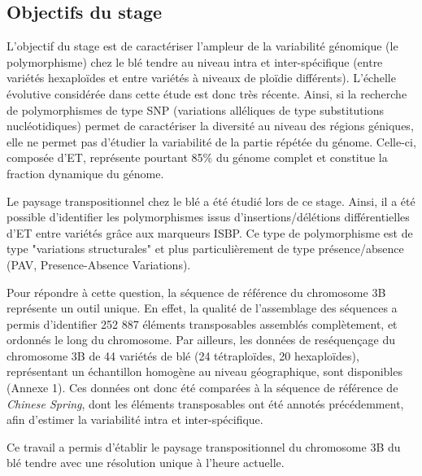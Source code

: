 \documentclass[a4paper, 12pt]{article}
\begin{document}
\begin{onehalfspace}
\section{Objectifs du stage}
L'objectif du stage est de caractériser l'ampleur de la variabilité génomique (le polymorphisme) chez le blé tendre au niveau intra et inter-spécifique (entre variétés hexaploïdes et entre variétés à niveaux de ploïdie différents). L'échelle évolutive considérée dans cette étude est donc très récente. Ainsi, si la recherche de polymorphismes de type SNP (variations alléliques de type substitutions nucléotidiques) permet de caractériser la diversité au niveau des régions géniques, elle ne permet pas d'étudier la variabilité de la partie répétée du génome. Celle-ci, composée d'ET, représente pourtant 85\% du génome complet et constitue la fraction dynamique du génome.

Le paysage transpositionnel chez le blé a été étudié lors de ce stage. Ainsi, il a été possible d'identifier les polymorphismes issus d'insertions/délétions différentielles d'ET entre variétés grâce aux marqueurs ISBP. Ce type de polymorphisme est de type "variations structurales" et plus particulièrement de type présence/absence (PAV, Presence-Absence Variations).

Pour répondre à cette question, la séquence de référence du chromosome 3B représente un outil unique. En effet, la qualité de l'assemblage des séquences a permis d'identifier 252 887 éléments transposables assemblés complètement, et ordonnés le long du chromosome. Par ailleurs, les données de reséquençage du chromosome 3B de 44 variétés de blé (24 tétraploïdes, 20 hexaploïdes), représentant un échantillon homogène au niveau géographique, sont disponibles (Annexe 1). Ces données ont donc été comparées à la séquence de référence de \textit{Chinese Spring}, dont les éléments transposables ont été annotés précédemment, afin d'estimer la variabilité intra et inter-spécifique. 

Ce travail a permis d'établir le paysage transpositionnel du chromosome 3B du blé tendre avec une résolution unique à l'heure actuelle.\\

\newpage
\thispagestyle{empty}
\null
\addtocounter{page}{-1}
\newpage



\end{onehalfspace}
\end{document}
